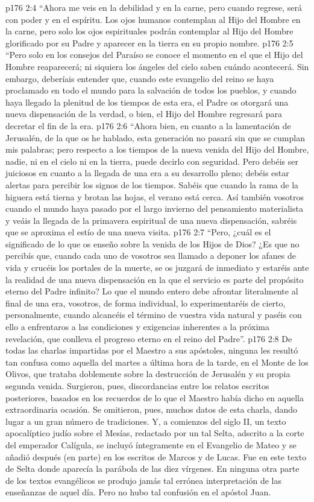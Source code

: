 \vs p176 2:4 “Ahora me veis en la debilidad y en la carne, pero cuando regrese, será con poder y en el espíritu. Los ojos humanos contemplan al Hijo del Hombre en la carne, pero solo los ojos espirituales podrán contemplar al Hijo del Hombre glorificado por su Padre y aparecer en la tierra en su propio nombre.
\vs p176 2:5 “Pero solo en los consejos del Paraíso se conoce el momento en el que el Hijo del Hombre reaparecerá; ni siquiera los ángeles del cielo saben cuándo acontecerá. Sin embargo, deberíais entender que, cuando este evangelio del reino se haya proclamado en todo el mundo para la salvación de todos los pueblos, y cuando haya llegado la plenitud de los tiempos de esta era, el Padre os otorgará una nueva dispensación de la verdad, o bien, el Hijo del Hombre regresará para decretar el fin de la era.
\vs p176 2:6 “Ahora bien, en cuanto a la lamentación de Jerusalén, de la que os he hablado, esta generación no pasará sin que se cumplan mis palabras; pero respecto a los tiempos de la nueva venida del Hijo del Hombre, nadie, ni en el cielo ni en la tierra, puede decirlo con seguridad. Pero debéis ser juiciosos en cuanto a la llegada de una era a su desarrollo pleno; debéis estar alertas para percibir los signos de los tiempos. Sabéis que cuando la rama de la higuera está tierna y brotan las hojas, el verano está cerca. Así también vosotros cuando el mundo haya pasado por el largo invierno del pensamiento materialista y veáis la llegada de la primavera espiritual de una nueva dispensación, sabréis que se aproxima el estío de una nueva visita.
\vs p176 2:7 “Pero, ¿cuál es el significado de lo que os enseño sobre la venida de los Hijos de Dios? ¿Es que no percibís que, cuando cada uno de vosotros sea llamado a deponer los afanes de vida y crucéis los portales de la muerte, se os juzgará de inmediato y estaréis ante la realidad de una nueva dispensación en la que el servicio es parte del propósito eterno del Padre infinito? Lo que el mundo entero debe afrontar literalmente al final de una era, vosotros, de forma individual, lo experimentaréis de cierto, personalmente, cuando alcancéis el término de vuestra vida natural y paséis con ello a enfrentaros a las condiciones y exigencias inherentes a la próxima revelación, que conlleva el progreso eterno en el reino del Padre”.
\vs p176 2:8 De todas las charlas impartidas por el Maestro a sus apóstoles, ninguna les resultó tan confusa como aquella del martes a última hora de la tarde, en el Monte de los Olivos, que trataba doblemente sobre la destrucción de Jerusalén y su propia segunda venida. Surgieron, pues, discordancias entre los relatos escritos posteriores, basados en los recuerdos de lo que el Maestro había dicho en aquella extraordinaria ocasión. Se omitieron, pues, muchos datos de esta charla, dando lugar a un gran número de tradiciones. Y, a comienzos del siglo II, un texto apocalíptico judío sobre el Mesías, redactado por un tal Selta, adscrito a la corte del emperador Calígula, se incluyó íntegramente en el Evangelio de Mateo y se añadió después (en parte) en los escritos de Marcos y de Lucas. Fue en este texto de Selta donde aparecía la parábola de las diez vírgenes. En ninguna otra parte de los textos evangélicos se produjo jamás tal errónea interpretación de las enseñanzas de aquel día. Pero no hubo tal confusión en el apóstol Juan.
